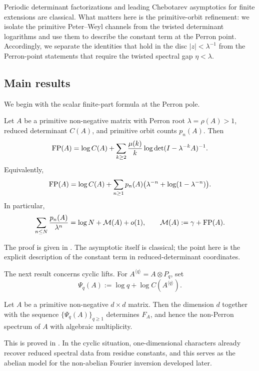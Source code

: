 Periodic determinant factorizations and leading Chebotarev asymptotics
for finite extensions are classical. What matters here is
the primitive-orbit refinement: we isolate the primitive Peter--Weyl
channels from the twisted determinant logarithms and use them to
describe the constant term at the Perron point. Accordingly, we
separate the identities that hold in the disc \(|z|<\lambda^{-1}\) from
the Perron-point statements that require the twisted spectral gap
\(\eta<\lambda\).

\subsection{Main results}

We begin with the scalar finite-part formula at the Perron pole.

\begin{proposition}
  \label{thm:intro-finite-part}
  Let \(A\) be a primitive non-negative matrix with Perron root
  \(\lambda=\rho(A)>1\), reduced determinant \(C(A)\), and primitive
  orbit counts \(p_n(A)\). Then
  \[
    \operatorname{FP}(A)
    =\log C(A)
      +\sum_{k\ge 2}\frac{\mu(k)}{k}
        \log\det(I-\lambda^{-k}A)^{-1}.
  \]
  Equivalently,
  \[
    \operatorname{FP}(A)
    =\log C(A)
      +\sum_{n\ge 1}p_n(A)
        \bigl(\lambda^{-n}+\log(1-\lambda^{-n})\bigr).
  \]
  In particular,
  \[
    \sum_{n\le N}\frac{p_n(A)}{\lambda^n}
    =\log N+\mathcal M(A)+o(1),
    \qquad
    \mathcal M(A):=\gamma+\operatorname{FP}(A).
  \]
\end{proposition}

The proof is given in
.
The asymptotic itself is classical; the point here is the explicit
description of the constant term in reduced-determinant coordinates.

The next result concerns cyclic lifts. For
\(A^{\langle q\rangle}=A\otimes P_q\), set
\[
  \Psi_q(A):=\log q+\log C(A^{\langle q\rangle}).
\]

\begin{proposition}
  \label{thm:intro-cyclic-reconstruction}
  Let \(A\) be a primitive non-negative \(d\times d\) matrix. Then the
  dimension \(d\) together with the sequence
  \(\{\Psi_q(A)\}_{q\ge 1}\) determines \(F_A\), and hence the
  non-Perron spectrum of \(A\) with algebraic multiplicity.
\end{proposition}

This is proved in
. In the
cyclic situation, one-dimensional characters already recover reduced
spectral data from residue constants, and this serves as the abelian
model for the non-abelian Fourier inversion developed later.

